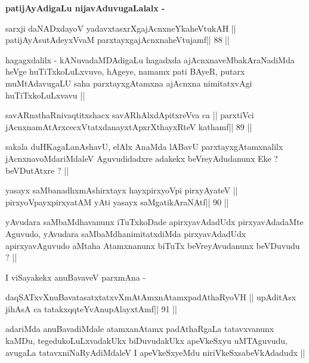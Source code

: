 \begin{artha}
\textbf{patijAyAdigaLu nijavAduvugaLalalx -}
\end{artha}

\begin{shl}
sarxji daNADxdayoV yadavxtasxrXgajAcnxneYkaheVtukAH ||
patijAyAsutAdeyxVvaM parxtayxgajAcnxnaheVtujamf\hfill || 88 ||
\end{shl}

\begin{artha}
hagagxdalilx - kANuvadaMDAdigaLu hagadxda ajAcnxnaveMbakAraNadiMda
heVge huTiTxkoLuLxvuvo, hAgeye, namamx pati BAyeR, putarx
muMtAdavugaLU saha parxtayxgAtamxna ajAcnxna nimitatxvAgi
huTiTxkoLuLxvavu ||
\end{artha}

\begin{shl}
savARnathaRnivaqtitxshacx savARhAlxdApitxreVva ca ||
parxtiVci jAcnxnamAtArxcecxVtatxdanayxtApxrXthayxRteV kathamf\hfill || 89 ||
\end{shl}

\begin{artha}
sakala duHKagaLanAshavU, elAlx AnaMda lABavU parxtayxgAtamxnalilx
jAcnxnavoMdariMdaleV Aguvudidadxre adakekx beVreyAdudanunx Eke ?
beVDutAtxre ? || 
\end{artha}

\begin{shl}
yasayx saMbanadhxmAshirxtayx hayxpirxyoV\s pi pirxyAyateV ||
pirxyoV\s payxpirxyatAM yAti yasayx saMgatikAraNAtf\hfill || 90 ||
\end{shl}

\begin{artha}
yAvudara saMbaMdhavanunx iTuTxkoDade apirxyavAdadUdx pirxyavAdadaMte
Aguvudo, yAvudara saMbaMdhanimitatxdiMda pirxyavAdadUdx
apirxyavAguvudo aMtaha Atamxnanunx biTuTx beVreyAvudanunx beVDuvudu ? ||
\end{artha}

\begin{artha}
I viSayakekx anuBavaveV parxmAna -
\end{artha}

\begin{shl}
daqSATxvX\s nuBavatasatxtatxvXmAtAmxnAtamxpadAthaRyoVH ||
upAditAsx jihAsA ca tatakxqqteYvAnupAlayxtAmf\hfill || 91 ||
\end{shl}

\begin{artha}
adariMda anuBavadiMdale atamxanAtamx padAthaRgaLa tatavxvanunx kaMDu,
tegedukoLuLxvadakUkx biDuvudakUkx apeVkeSxyu uMTAguvudu, avugaLa
tatavxniNaRyAdiMdaleV I apeVkeSxyeMdu niriVkeSxsabeVkAdadudx ||
\end{artha}

